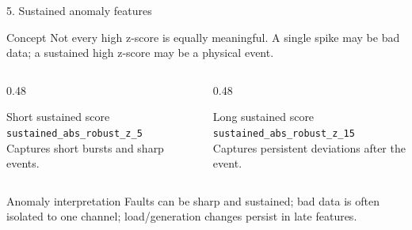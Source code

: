 \documentclass[aspectratio=169,10pt,t]{beamer}
\newcommand{\code}[1]{\texttt{\footnotesize #1}}
\begin{document}
\iffalse
\begin{frame}{5. Sustained anomaly features}
\small
\begin{block}{Concept}
Not every high z-score is equally meaningful. A single spike may be bad data; a sustained high z-score may be a physical event.
\end{block}
\begin{columns}[T,totalwidth=\textwidth]
\begin{column}{0.48\textwidth}
\begin{exampleblock}{Short sustained score}
\code{sustained\_abs\_robust\_z\_5}\\
Captures short bursts and sharp events.
\end{exampleblock}
\end{column}
\begin{column}{0.48\textwidth}
\begin{exampleblock}{Long sustained score}
\code{sustained\_abs\_robust\_z\_15}\\
Captures persistent deviations after the event.
\end{exampleblock}
\end{column}
\end{columns}
\vspace{2mm}
\begin{alertblock}{Anomaly interpretation}
Faults can be sharp and sustained; bad data is often isolated to one channel; load/generation changes persist in late features.
\end{alertblock}
\end{frame}
\end{document}
